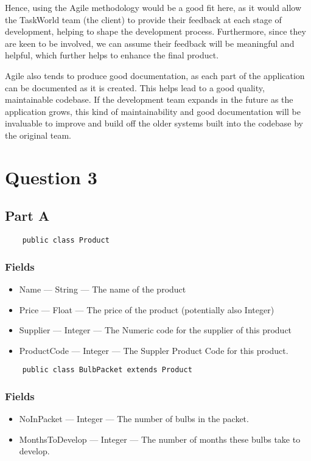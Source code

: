 \documentclass[a4paper]{report}
\begin{document}
Hence, using the Agile methodology would be a good fit here, as it would allow the TaskWorld team (the client) to provide 
their feedback at each stage of development, helping to shape the development process. Furthermore, since they are keen to
be involved, we can assume their feedback will be meaningful and helpful, which further helps to enhance the final product.

Agile also tends to produce good documentation, as each part of the application can be documented as it is created. This helps
lead to a good quality, maintainable codebase. If the development team expands in the future as the application grows, this kind
of maintainability and good documentation will be invaluable to improve and build off the older systems built into the codebase
by the original team.


\section{Question 3}


\subsection{Part A}

\begin{lstlisting}
    public class Product
\end{lstlisting}

\subsubsection{Fields}
\begin{itemize}
    \item Name --- String --- The name of the product
    \item Price --- Float --- The price of the product (potentially also Integer)
    \item Supplier --- Integer --- The Numeric code for the supplier of this product
    \item ProductCode --- Integer --- The Suppler Product Code for this product.
\end{itemize}


\begin{lstlisting}
    public class BulbPacket extends Product
\end{lstlisting}

\subsubsection{Fields}
\begin{itemize}
    \item NoInPacket --- Integer --- The number of bulbs in the packet.
    \item MonthsToDevelop --- Integer --- The number of months these bulbs take to develop.
\end{itemize}
\end{document}
